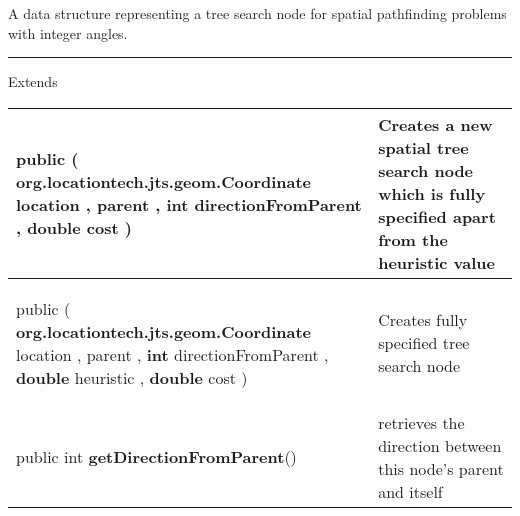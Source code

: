  {\scriptsize A data structure representing a tree search node for \newline%
 spatial pathfinding problems with integer angles.
 
\vspace*{4pt} \hrule \vspace*{3pt}
Extends \textbf{ \hyperref[tab:SearchNode]{\color{blue}{SearchNode}} }
\vspace*{-5pt} 
\begin{tabularx}{\linewidth}{X|m{}}
\label{tab:DirectedSearchNode}
\begin{raggedleft}public  \textbf{\hyperref[tab:DirectedSearchNode]{\color{blue}{DirectedSearchNode}} }(\newline \hfill 
\hspace*{ 5pt} \textbf{org.locationtech.jts.geom.Coordinate} location , \newline
 \hspace*{ 5pt} \textbf{\hyperref[tab:DirectedSearchNode]{\color{blue}{DirectedSearchNode}}} parent , \newline
 \hspace*{ 5pt} \textbf{int} directionFromParent , \newline
 \hspace*{ 5pt} \textbf{double} cost  )
\end{raggedleft} &
 Creates a new spatial tree search node which is fully specified apart from\newline%
 the heuristic value\\ \hline 
\begin{raggedleft}public  \textbf{\hyperref[tab:DirectedSearchNode]{\color{blue}{DirectedSearchNode}} }(\newline \hfill 
\hspace*{ 5pt} \textbf{org.locationtech.jts.geom.Coordinate} location , \newline
 \hspace*{ 5pt} \textbf{\hyperref[tab:DirectedSearchNode]{\color{blue}{DirectedSearchNode}}} parent , \newline
 \hspace*{ 5pt} \textbf{int} directionFromParent , \newline
 \hspace*{ 5pt} \textbf{double} heuristic , \newline
 \hspace*{ 5pt} \textbf{double} cost  )
\end{raggedleft} &
 Creates fully specified tree search node\\ \hline 
\begin{raggedleft}public int \textbf{getDirectionFromParent}()
\end{raggedleft} &
 retrieves the direction between this node's parent and itself\\\end{tabularx}
}
